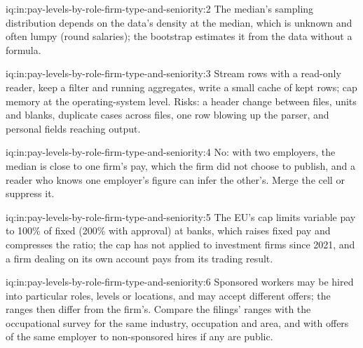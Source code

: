 \begin{solution}{iq:in:pay-levels-by-role-firm-type-and-seniority:2}
The median's sampling distribution depends on the data's density at the median, which is unknown and often lumpy (round
salaries); the bootstrap estimates it from the data without a formula.
\end{solution}

\begin{solution}{iq:in:pay-levels-by-role-firm-type-and-seniority:3}
Stream rows with a read-only reader, keep a filter and running aggregates, write a small cache of kept rows; cap memory at
the operating-system level. Risks: a header change between files, units and blanks, duplicate cases across files, one
row blowing up the parser, and personal fields reaching output.
\end{solution}

\begin{solution}{iq:in:pay-levels-by-role-firm-type-and-seniority:4}
No: with two employers, the median is close to one firm's pay, which the firm did not choose to publish, and a reader
who knows one employer's figure can infer the other's. Merge the cell or suppress it.
\end{solution}

\begin{solution}{iq:in:pay-levels-by-role-firm-type-and-seniority:5}
The EU's cap limits variable pay to 100\% of fixed (200\% with approval) at banks, which raises fixed pay and compresses
the ratio; the cap has not applied to investment firms since 2021, and a firm dealing on its own account pays from its
trading result.
\end{solution}

\begin{solution}{iq:in:pay-levels-by-role-firm-type-and-seniority:6}
Sponsored workers may be hired into particular roles, levels or locations, and may accept different offers; the ranges
then differ from the firm's. Compare the filings' ranges with the occupational survey for the same industry, occupation
and area, and with offers of the same employer to non-sponsored hires if any are public.
\end{solution}

